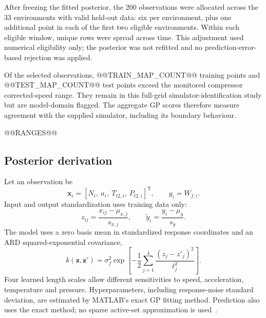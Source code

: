After freezing the fitted posterior, the 200 observations were allocated across the 33 environments with valid held-out data: six per environment, plus one additional point in each of the first two eligible environments. Within each eligible window, unique rows were spread across time. This adjustment used numerical eligibility only; the posterior was not refitted and no prediction-error-based rejection was applied.

Of the selected observations, @@TRAIN_MAP_COUNT@@ training points and @@TEST_MAP_COUNT@@ test points exceed the monitored compressor corrected-speed range. They remain in this full-grid simulator-identification study but are model-domain flagged. The aggregate GP scores therefore measure agreement with the supplied simulator, including its boundary behaviour.

@@RANGES@@

\clearpage
\subsection{Posterior derivation}
Let an observation be
\begin{equation}
\mathbf x_i=[N_i,\ a_i,\ T_{t2,i},\ P_{t2,i}]^{\mathsf T},\qquad y_i=W_{f,i}.
\end{equation}
Input and output standardization uses training data only:
\begin{equation}
z_{ij}=\frac{x_{ij}-\mu_{x,j}}{s_{x,j}},\qquad \tilde y_i=\frac{y_i-\mu_y}{s_y}.
\end{equation}
The model uses a zero basis mean in standardized response coordinates and an ARD squared-exponential covariance,
\begin{equation}
k(\mathbf z,\mathbf z')=\sigma_f^2\exp\left[-\frac12\sum_{j=1}^{4}\frac{(z_j-z'_j)^2}{\ell_j^2}\right].
\end{equation}
Four learned length scales allow different sensitivities to speed, acceleration, temperature and pressure. Hyperparameters, including response-noise standard deviation, are estimated by MATLAB's exact GP fitting method. Prediction also uses the exact method; no sparse active-set approximation is used~\cite{mathworks}.

